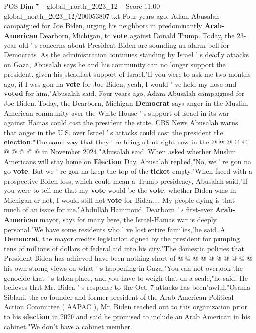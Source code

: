 \begin{textsample}{POS Dim 7 – global\_north\_2023\_12 – Score 11.00 – global\_north\_2023\_12/200053807.txt}  \label{ex:f7_pos_148}
Four years ago, Adam Abusalah campaigned for Joe Biden, urging his neighbors in predominantly \textbf{Arab-American} Dearborn, Michigan, to \textbf{vote} against Donald Trump.
Today, the 23-year-old ' s concerns about President Biden are sounding an alarm bell for Democrats.
As the administration continues standing by Israel ' s deadly attacks on Gaza, Abusalah says he and his community can no longer support the president, given his steadfast support of Israel."If you were to ask me two months ago, if I was gon na \textbf{vote} for Joe Biden, yeah, I would ' ve held my nose and \textbf{voted} for him,"Abusalah said.
Four years ago, Adam Abusalah campaigned for Joe Biden.
Today, the Dearborn, Michigan \textbf{Democrat} says anger in the Muslim American community over the White House ' s support of Israel in its war against Hamas could cost the president the state.
CBS News Abusalah warns that anger in the U.S. over Israel ' s attacks could cost the president the \textbf{election}."The same way that they ' re being silent right now in the @ @ @ @ @ @ @ @ @ @ in November 2024,"Abusalah said.
When asked whether Muslim Americans will stay home on \textbf{Election} Day, Abusalah replied,"No, we ' re gon na go \textbf{vote}.
But we ' re gon na keep the top of the \textbf{ticket} empty."When faced with a prospective Biden loss, which could mean a Trump presidency, Abusalah said,"If you were to tell me that my \textbf{vote} would be the \textbf{vote}, whether Biden wins in Michigan or not, I would still not \textbf{vote} for Biden....
My people dying is that much of an issue for me."Abdullah Hammoud, Dearborn ' s first-ever \textbf{Arab-American} mayor, says for many here, the Israel-Hamas war is deeply personal."We have some residents who ' ve lost entire families,"he said.
A \textbf{Democrat}, the mayor credits legislation signed by the president for pumping tens of millions of dollars of federal aid into his city."The domestic policies that President Biden has achieved have been nothing short of @ @ @ @ @ @ @ @ @ @ his own strong views on what ' s happening in Gaza."You can not overlook the genocide that ' s taken place, and you have to weigh that on a scale,"he said.
He believes that Mr.
Biden ' s response to the Oct. 7 attacks has been"awful."Osama Siblani, the co-founder and former president of the Arab American Political Action Committee ( AAPAC ), Mr.
Biden reached out to this organization prior to his \textbf{election} in 2020 and said he promised to include an Arab American in his cabinet."We don't have a cabinet member.

\end{textsample}
